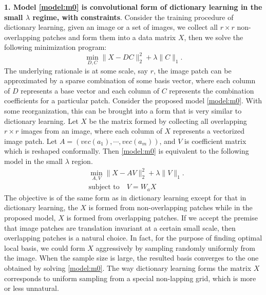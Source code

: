 \documentclass[a4paper]{article}
\begin{document}
\textbf{1. Model \eqref{model:m0} is convolutional form of dictionary learning in the small $\lambda$ regime, with constraints}. Consider the training procedure of dictionary learning, given an image or a set of images, we collect all $r\times r$ non-overlapping patches and form them into a data matrix $X$, then we solve the following minimization program:
\begin{equation}
\min_{D,C} \|X-DC\|_2^2 + \lambda\|C\|_1.
\end{equation}
The underlying rationale is at some scale, say $r$, the image patch can be approximated by a sparse combination of some basis vector, where each column of $D$ represents a base vector and each column of $C$ represents the combination coefficients for a particular patch.
Consider the proposed model \eqref{model:m0}. With some reorganization, this can be brought into a form that is very similar to dictionary learning. Let $X$ be the matrix formed by collecting all overlapping $r\times r$ images from an image, where each column of $X$ represents a vectorized image patch. Let $A=(vec(a_1),\cdots, vec(a_m))$, and $V$ is coefficient matrix which is reshaped conformally. Then \eqref{model:m0} is equivalent to the following model in the small $\lambda$ region.
\begin{equation}
\begin{aligned}
&\min_{A,V} \|X-AV\|_2^2+\lambda \|V\|_1. \\
&\textrm{subject to}\quad V=W_a X
\end{aligned}
\end{equation}
The objective is of the same form as in dictionary learning except for that in dictionary learning, the $X$ is formed from non-overlapping patches while in the proposed model,  $X$ is formed from overlapping patches. If we accept the premise that image patches are translation invariant at a certain small scale, then overlapping patches is a natural choice. In fact, for the purpose of finding optimal local basis, we could form $X$ aggressively by sampling randomly uniformly from the image. When the sample size is large, the resulted basis converges to the one obtained by solving \eqref{model:m0}. The way dictionary learning forms the matrix $X$ corresponds to uniform sampling from a special non-lapping grid, which is more or less unnatural. 
\end{document}
